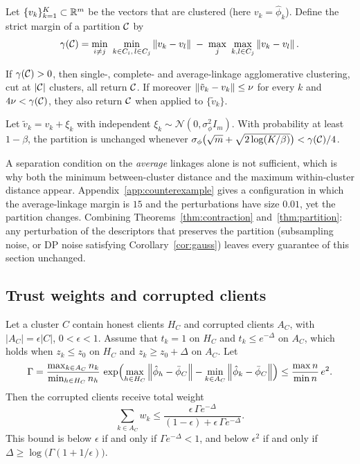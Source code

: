 Let $\{v_k\}_{k=1}^K\subset\mathbb{R}^m$ be the vectors that are clustered (here
$v_k=\hat\phi_k$). Define the strict margin of a partition $\mathcal{C}$ by
\[
  \gamma(\mathcal{C})=\min_{i\ne j}\ \min_{k\in C_i,\,l\in C_j}\left\lVert v_k-v_l \right\rVert\;-\;\max_j\ \max_{k,l\in C_j}\left\lVert v_k-v_l \right\rVert.
\]

\begin{theorem}\label{thm:partition}
If $\gamma(\mathcal{C})>0$, then single-, complete- and average-linkage agglomerative clustering,
cut at $|\mathcal{C}|$ clusters, all return $\mathcal{C}$. If moreover $\left\lVert \tilde v_k-v_k \right\rVert\le\nu$ for
every $k$ and $4\nu<\gamma(\mathcal{C})$, they also return $\mathcal{C}$ when applied to
$\{\tilde v_k\}$.
\end{theorem}

\begin{corollary}\label{cor:gauss}
Let $\tilde v_k=v_k+\xi_k$ with independent $\xi_k\sim\mathcal N(0,\sigma_\phi^2I_m)$. With
probability at least $1-\beta$, the partition is unchanged whenever
$\sigma_\phi\bigl(\sqrt m+\sqrt{2\log(K/\beta)}\bigr)<\gamma(\mathcal{C})/4$.
\end{corollary}

A separation condition on the \emph{average} linkages alone is not sufficient, which is why
both the minimum between-cluster distance and the maximum within-cluster distance appear.
Appendix~\ref{app:counterexample} gives a configuration in which the average-linkage margin
is $15$ and the perturbations have size $0.01$, yet the partition changes. Combining
Theorems~\ref{thm:contraction} and~\ref{thm:partition}: any perturbation of the descriptors
that preserves the partition (subsampling noise, or DP noise satisfying
Corollary~\ref{cor:gauss}) leaves every guarantee of this section unchanged.

\subsection{Trust weights and corrupted clients}
\label{sec:theory_trust}

\begin{proposition}\label{prop:trust}
Let a cluster $C$ contain honest clients $H_C$ and corrupted clients $A_C$, with
$|A_C|=\epsilon|C|$, $0<\epsilon<1$. Assume that $t_k=1$ on $H_C$ and $t_k\le e^{-\Delta}$ on
$A_C$, which holds when $z_k\le z_0$ on $H_C$ and $z_k\ge z_0+\Delta$ on $A_C$. Let
\[
  \Gamma=\frac{\max_{k\in A_C}n_k}{\min_{h\in H_C}n_h}\,
  \exp\Bigl(\max_{h\in H_C}\left\lVert \hat\phi_h-\bar\phi_C \right\rVert-\min_{k\in A_C}\left\lVert \hat\phi_k-\bar\phi_C \right\rVert\Bigr)\le\frac{\max n}{\min n}\,e^{2}.
\]
Then the corrupted clients receive total weight
\[
  \sum_{k\in A_C}w_k\le\frac{\epsilon\,\Gamma e^{-\Delta}}{(1-\epsilon)+\epsilon\,\Gamma e^{-\Delta}}.
\]
This bound is below $\epsilon$ if and only if $\Gamma e^{-\Delta}<1$, and below $\epsilon^2$
if and only if $\Delta\ge\log\bigl(\Gamma(1+1/\epsilon)\bigr)$.
\end{proposition}

